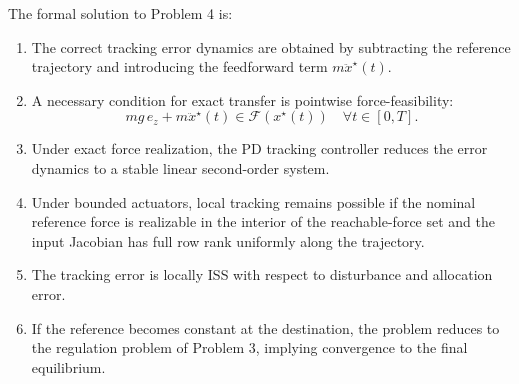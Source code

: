 \documentclass[11pt]{article}
\theoremstyle{definition}
\begin{document}
The formal solution to Problem 4 is:
\begin{enumerate}[label=\textbf{(\arabic*)}, leftmargin=1.5em]
  \item The correct tracking error dynamics are obtained by subtracting the reference trajectory and introducing the feedforward term $m\ddot x^\star(t)$.
  \item A necessary condition for exact transfer is pointwise force-feasibility:
  \[
  mg\,e_z + m\ddot x^\star(t)\in \mathcal{F}(x^\star(t))
  \quad \forall t\in[0,T].
  \]
  \item Under exact force realization, the PD tracking controller reduces the error dynamics to a stable linear second-order system.
  \item Under bounded actuators, local tracking remains possible if the nominal reference force is realizable in the interior of the reachable-force set and the input Jacobian has full row rank uniformly along the trajectory.
  \item The tracking error is locally ISS with respect to disturbance and allocation error.
  \item If the reference becomes constant at the destination, the problem reduces to the regulation problem of Problem 3, implying convergence to the final equilibrium.
\end{enumerate}
\end{document}
